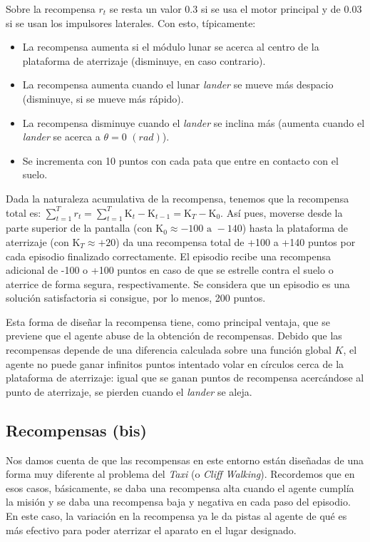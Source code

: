 \documentclass{article}
\begin{document}
Sobre la recompensa $r_t$ se resta un valor $0.3$ si se usa el motor principal y de $0.03$ si se usan los impulsores laterales. Con esto, típicamente:
\begin{itemize}
    \item La recompensa aumenta si el módulo lunar se acerca al centro de la plataforma de aterrizaje (disminuye, en caso contrario).
    \item La recompensa aumenta cuando el lunar \textit{lander} se mueve más despacio (disminuye, si se mueve más rápido).
    \item La recompensa disminuye cuando el \textit{lander} se inclina más (aumenta cuando el \textit{lander} se acerca a $\theta = 0$ $ (rad)$).
    \item Se incrementa con 10 puntos con cada pata que entre en contacto con el suelo.
\end{itemize}

Dada la naturaleza acumulativa de la recompensa, tenemos que la recompensa total es: $\sum_{t=1}^Tr_t=\sum_{t=1}^T \text{K}_t - \text{K}_{t-1} = \text{K}_T - \text{K}_0$. Así pues, moverse desde la parte superior de la pantalla (con $\text{K}_0 \approx -100 \text{ a } -140$) hasta la plataforma de aterrizaje (con $\text{K}_T \approx +20$) da una recompensa total de +100 a +140 puntos por cada episodio finalizado correctamente. El episodio recibe una recompensa adicional de -100 o +100 puntos en caso de que se estrelle contra el suelo o aterrice de forma segura, respectivamente. Se considera que un episodio es una solución satisfactoria si consigue, por lo menos, 200 puntos.



Esta forma de diseñar la recompensa tiene, como principal ventaja, que se previene que el agente abuse de la obtención de recompensas. Debido que las recompensas depende de una diferencia calculada sobre una función global $K$, el agente no puede ganar infinitos puntos intentado volar en círculos cerca de la plataforma de aterrizaje: igual que se ganan puntos de recompensa acercándose al punto de aterrizaje, se pierden cuando el \textit{lander} se aleja.

\subsection{Recompensas (bis)}
Nos damos cuenta de que las recompensas en este entorno están diseñadas de una forma muy diferente al problema del \textit{Taxi} (o \textit{Cliff Walking}). Recordemos que en esos casos, básicamente, se daba una recompensa alta cuando el agente cumplía la misión y se daba una recompensa baja y negativa en cada paso del episodio. En este caso, la variación en la recompensa ya le da pistas al agente de qué es más efectivo para poder aterrizar el aparato en el lugar designado.
\end{document}
